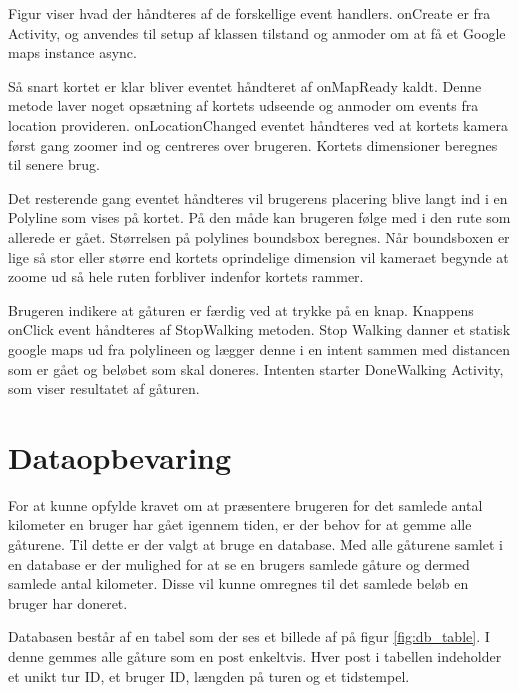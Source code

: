 Figur  viser hvad der håndteres af de forskellige event handlers. onCreate er fra Activity, og anvendes til setup af klassen tilstand og anmoder om at få et Google maps instance async.


Så snart kortet er klar bliver eventet håndteret af onMapReady kaldt. Denne metode laver noget opsætning af kortets udseende og anmoder om events fra location provideren. onLocationChanged eventet håndteres ved at kortets kamera først gang zoomer ind og centreres over brugeren. Kortets dimensioner beregnes til senere brug.

Det resterende gang eventet håndteres vil brugerens placering blive langt ind i en Polyline som vises på kortet. På den måde kan brugeren følge med i den rute som allerede er gået. Størrelsen på polylines boundsbox beregnes. Når boundsboxen er lige så stor eller større end kortets oprindelige dimension vil kameraet begynde at zoome ud så hele ruten forbliver indenfor kortets rammer.

Brugeren indikere at gåturen er færdig ved at trykke på en knap. Knappens onClick event håndteres af StopWalking metoden. Stop Walking danner et statisk google maps ud fra polylineen og lægger denne i en intent sammen med distancen som er gået og beløbet som skal doneres. Intenten starter DoneWalking Activity, som viser resultatet af gåturen.

\FloatBarrier
\section{Dataopbevaring}
For at kunne opfylde kravet om at præsentere brugeren for det samlede antal kilometer en bruger har gået igennem tiden, er der behov for at gemme alle gåturene. Til dette er der valgt at bruge en database. Med alle gåturene samlet i en database er der mulighed for at se en brugers samlede gåture og dermed samlede antal kilometer. Disse vil kunne omregnes til det samlede beløb en bruger har doneret.


\noindent
Databasen består af en tabel som der ses et billede af på figur \ref{fig:db_table}. I denne gemmes alle gåture som en post enkeltvis. Hver post i tabellen indeholder et unikt tur ID, et bruger ID, længden på turen og et tidstempel.

